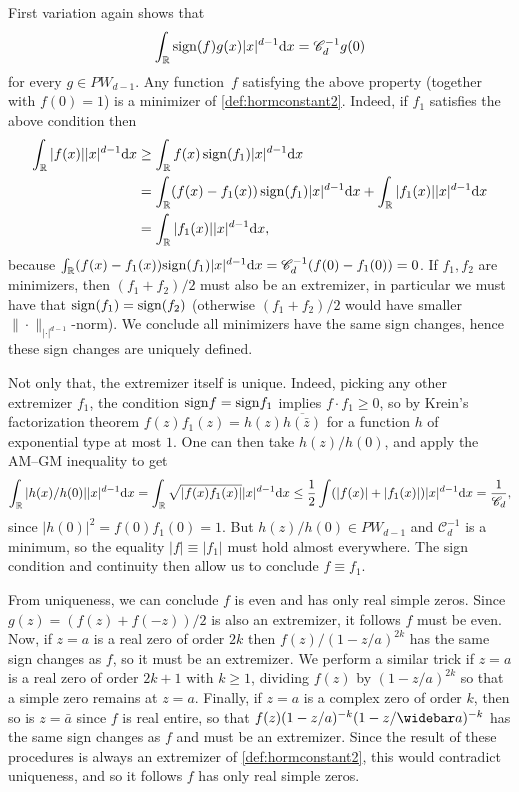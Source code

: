 \documentclass[a4paper,reqno,12pt]{amsart}
\newcommand{\C}{\mathscr{C}}
\renewcommand{\r}{\mathbb{R}}
\renewcommand{\d}{{\rm d}}
\newcommand{\ov}{\widebar}
\newcommand{\sign}{{\rm sign}}
\begin{document}
First variation again shows that 
\begin{align}\label{id:firstvar}
    \int_{\r} \sign(f) g(x) |x|^{d-1}\d x = \C_d^{-1} g(0)
\end{align}
for every $g\in PW_{d-1}$. Any function~$f$ satisfying the above property (together with $f(0)=1$) is a minimizer of \eqref{def:hormconstant2}. Indeed, if $f_1$ satisfies the above condition then
\begin{align*}
\int_\r |f(x)||x|^{d-1}\d x & \geq \int_\r f(x)\, \sign(f_1)|x|^{d-1}\d x  \\
&= \int_\r (f(x) -f_1(x))\,\sign(f_1)|x|^{d-1}\d x + \int_\r |f_1(x)||x|^{d-1}\d x \\
& = \int_\r |f_1(x)||x|^{d-1}\d x,
\end{align*}
because $\int_\r (f(x) -f_1(x))\sign(f_1)|x|^{d-1}\d x = \C_d^{-1} (f(0)-f_1(0))=0$. If $f_1,f_2$ are minimizers, then $(f_1+f_2)/2$ must also be an extremizer, in particular we must have that $\sign(f_1)=\sign(f_2)$ (otherwise $(f_1+f_2)/2$ would have smaller $ \|\cdot\|_{|\cdot|^{d-1}}$-norm). We conclude all minimizers have the same sign changes, hence these sign changes are uniquely defined.

Not only that, the extremizer itself is unique. Indeed, picking any other extremizer $f_1$, the condition $\sign f = \sign f_1$ implies $f \cdot f_1 \geq 0$, so by Krein's factorization theorem $f(z) f_1(z) = h(z) \overline{h(\bar z)}$ for a function $h$ of exponential type at most $1$. One can then take $h(z)/h(0)$, and apply the AM--GM inequality to get
$$
    \int_\r |h(x)/h(0)| |x|^{d-1} \d x =  \int_\r \sqrt{|f(x)f_1(x)|} |x|^{d-1}\d x \leq \frac12 \int (|f(x)| + |f_1(x)|) |x|^{d-1} \d x = \frac{1}{\C_d},
$$
since $|h(0)|^2 = f(0) f_1(0) =1$. But $h(z)/h(0)\in PW_{d-1}$ and $\C_d^{-1}$ is a minimum, so the equality  $|f| \equiv |f_1|$ must hold almost everywhere. The sign condition and continuity then allow us to conclude $f \equiv f_1.$ 

From uniqueness, we can conclude $f$ is even and has only real simple zeros. Since $g(z) = {(f(z) + f(-z))}/{2}$ is also an extremizer, it follows $f$ must be even. Now, if $z=a$ is a real zero of order $2k$ then $f(z)/(1-z/a)^{2k}$ has the same sign changes as $f$, so it must be an extremizer. We perform a similar trick if $z=a$ is a real zero of order $2k+1$ with $k \geq 1$, dividing $f(z)$ by $(1-z/a)^{2k}$ so that a simple zero remains at $z =a$. Finally, if $z=a$ is a complex zero of order $k$, then so is $z=\bar a$ since $f$ is real entire, so that $f(z)(1-z/a)^{ -k}(1-z/{\ov a})^{-k}$ has the same sign changes as $f$ and must be an extremizer. Since the result of these procedures is always an extremizer of \eqref{def:hormconstant2}, this would contradict uniqueness, and so it follows $f$ has only real simple zeros. 
\end{document}
